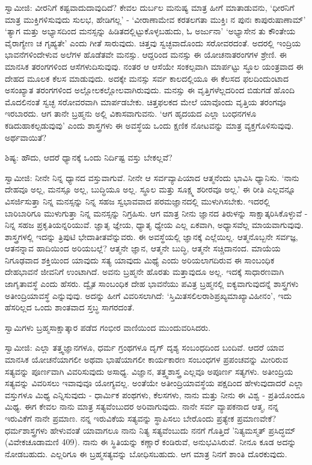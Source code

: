 ಸ್ವಾಮೀಜಿ: ವೀರನಿಗೆ ಕಷ್ಟವಾದುದಾವುದಿದೆ? ಕೇವಲ ದುರ್ಬಲ ಮನುಷ್ಯ ಮಾತ್ರ ಹೀಗೆ ಮಾತಾಡುವನು, ‘ಧೀರನಿಗೆ ಮಾತ್ರ ಮುಕ್ತಿಗಳಿಸುವುದು ಸುಲಭ, ಹೇಡಿಗಲ್ಲ’ - ‘ವೀರಾಣಾಮೇವ ಕರತಲಗತಾ ಮುಕ್ತಿಃ ನ ಪುನಃ ಕಾಪುರುಷಾಣಾಮ್’ ‘ತ್ಯಾಗ ಮತ್ತು ಅಭ್ಯಾಸದಿಂದ ಮನಸ್ಸನ್ನು ಹಿಡಿತದಲ್ಲಿಟ್ಟುಕೊಳ್ಳಬಹುದು, ಓ ಅರ್ಜುನಾ’ ‘ಅಭ್ಯಾಸೇನ ತು ಕೌಂತೇಯ ವೈರಾಗ್ಯೇಣ ಚ ಗೃಹ್ಯತೇ’ ಎಂದು ಗೀತೆ ಸಾರುವುದು. ಚಿತ್ತವು ಸ್ವಚ್ಛವಾದೊಂದು ಸರೋವರದಂತೆ. ಅದರಲ್ಲಿ ಇಂದ್ರಿಯ ಭಾವನೆಗಳಿಂದೇಳುವ ಅಲೆಗಳ ಹೊಡೆತವೇ ಮನಸ್ಸು. ಆದ್ದರಿಂದ ಮನಸ್ಸು ಈ ಯೋಚನಾತರಂಗಗಳ ಶ್ರೇಣಿ. ಈ ಮಾನಸಿಕ ತರಂಗಗಳಿಂದ ಆಸೆಗಳುದಿಸುವುವು. ನಂತರ ಆ ಆಸೆಯೇ ಸಂಕಲ್ಪವಾಗಿ ಮಾರ್ಪಟ್ಟು ಸ್ಥೂಲ ಯಂತ್ರವಾದ ಈ ದೇಹದ ಮೂಲಕ ಕೆಲಸ ಮಾಡುವುದು. ಅದಕ್ಕೇ ಮನಸ್ಸು ಸರ್ವ ಕಾಲದಲ್ಲಿಯೂ ಈ ಕೆಲಸದ ಫಲದಿಂದುಂಟಾದ ಅಸಂಖ್ಯಾತ ತರಂಗಗಳಿಂದ ಅಲ್ಲೋಲಕಲ್ಲೋಲವಾಗಿರುವುದು. ಮನಸ್ಸು ಈ ವೃತ್ತಿಗಳೆಲ್ಲದರಿಂದ ಬಿಡುಗಡೆ ಹೊಂದಿ ಮೊದಲಿನಂತೆ ಸ್ವಚ್ಛ ಸರೋವರವಾಗಿ ಮಾರ್ಪಡಬೇಕು. ಚಿತ್ತಫಲಕದ ಮೇಲೆ ಯಾವೊಂದು ವೃತ್ತಿಯ ತರಂಗವೂ ಇರಬಾರದು. ಆಗ ತಾನೇ ಬ್ರಹ್ಮನು ಅಲ್ಲಿ ವಿಕಾಸವಾಗುವನು. ‘ಆಗ ಹೃದಯದ ಎಲ್ಲಾ ಬಂಧನಗಳೂ ಕಡಿದುಹಾಕಲ್ಪಡುವುವು’ ಎಂದು ಶಾಸ್ತ್ರಗಳು ಈ ಅವಸ್ಥೆಯ ಒಂದು ಕ್ಷಣಿಕ ನೋಟವನ್ನು ಮಾತ್ರ ವ್ಯಕ್ತಗೊಳಿಸುವುವು. ಅರ್ಥವಾಯಿತೆ?

ಶಿಷ್ಯ: ಹೌದು, ಆದರೆ ಧ್ಯಾನಕ್ಕೆ ಒಂದು ನಿರ್ದಿಷ್ಟ ವಸ್ತು ಬೇಕಲ್ಲವೆ?

ಸ್ವಾಮೀಜಿ: ನೀನೇ ನಿನ್ನ ಧ್ಯಾನದ ವಸ್ತುವಾಗುವೆ. ನೀನೇ ಆ ಸರ್ವವ್ಯಾಪಿಯಾದ ಆತ್ಮನೆಂದು ಭಾವಿಸಿ ಧ್ಯಾನಿಸು. ‘ನಾನು ದೇಹವೂ ಅಲ್ಲ, ಮನಸ್ಸೂ ಅಲ್ಲ, ಬುದ್ಧಿಯೂ ಅಲ್ಲ. ಸ್ಥೂಲ ಮತ್ತು ಸೂಕ್ಷ್ಮ ಶರೀರವೂ ಅಲ್ಲ.’ ಈ ರೀತಿ ಎಲ್ಲವನ್ನೂ ವಿಸರ್ಜಿಸುತ್ತಾ ನಿನ್ನ ಮನಸ್ಸನ್ನು ನಿನ್ನ ಸಹಜ ಸ್ವಭಾವವಾದ ಪರಮಜ್ಞಾನದಲ್ಲಿ ಮುಳುಗಿಸಬೇಕು. ಇದರಲ್ಲಿ ಬಾರಿಬಾರಿಗೂ ಮುಳುಗುತ್ತಾ ನಿನ್ನ ಮನಸ್ಸನ್ನು ನಿಗ್ರಹಿಸು. ಆಗ ಮಾತ್ರ ನೀನು ಜ್ಞಾನದ ತಿರುಳನ್ನು ಸಾಕ್ಷಾತ್ಕರಿಸಿಕೊಳ್ಳುವೆ - ನಿನ್ನ ಸಹಜ ಪ್ರಕೃತಿಯನ್ನರಿಯುವೆ. ಜ್ಞಾತೃ ಜ್ಞೇಯ, ಧ್ಯಾತೃ ಧ್ಯೇಯ ಎಲ್ಲ ಏಕವಾಗಿ, ಅಧ್ಯಾಸವೆಲ್ಲ ಮಾಯವಾಗುವುವು. ಶಾಸ್ತ್ರಗಳಲ್ಲಿ ಇದನ್ನು ತ್ರಿಪುಟಿ ಭೇದಾತೀತವೆನ್ನುವರು. ಈ ಅವಸ್ಥೆಯಲ್ಲಿ ಜ್ಞಾನಕ್ಕೆ ಎಲ್ಲೆಯಿಲ್ಲ. ಆತ್ಮನೊಬ್ಬನೇ ಸರ್ವಜ್ಞ, ಆತನನ್ನಾವ ಹಾದಿಯಿಂದ ಅರಿಯಬಲ್ಲೆ? ಆತ್ಮನೇ ಜ್ಞಾನ, ಆತ್ಮನೇ ಬುದ್ಧಿ, ಆತ್ಮನೇ ಸಚ್ಚಿದಾನಂದ. ಮಾಯೆಯ ನಿಗೂಢವಾದ ಶಕ್ತಿಯಿಂದ ಯಾವುದು ಸತ್ಯ ಯಾವುದು ಮಿಥ್ಯೆ ಎಂದು ಅರಿಯಲಾಗದಿರುವ ಈ ಸಾಂಬಂಧಿಕ ದೇಹಭಾವನೆ ಜೀವನಿಗೆ ಉಂಟಾಗಿದೆ. ಅವನು ಬ್ರಹ್ಮನೇ ಹೊರತು ಮತ್ತಾವುದೂ ಅಲ್ಲ. ಇದಕ್ಕೆ ಸಾಧಾರಣವಾಗಿ ಜಾಗೃತಾವಸ್ಥೆ ಎಂದು ಹೆಸರು. ದ್ವೈತ ಸಾಂಬಂಧಿಕ ದೇಹ ಭಾವನೆಯು ಪವಿತ್ರ ಬ್ರಹ್ಮನಲ್ಲಿ ಐಕ್ಯವಾಗುವುದನ್ನೆ ಶಾಸ್ತ್ರಗಳು ಅತೀಂದ್ರಿಯಾವಸ್ಥೆ ಎನ್ನುವುವು. ಅದನ್ನು ಹೀಗೆ ವಿವರಿಸಲಾಗಿದೆ: ‘ಸ್ತಿಮಿತಸಲಿಲರಾಶಿಪ್ರಖ್ಯಮಾಖ್ಯಾವಿಹೀನಂ’, ಇದು ಹೆಸರಿಲ್ಲದ ಒಂದು ಶಾಂತವಾದ ಸ್ತಬ್ಧ ಸಾಗರದಂತೆ.

ಸ್ವಾಮಿಗಳು ಬ್ರಹ್ಮಸಾಕ್ಷಾತ್ಕಾರ ಪಡೆದ ಗಂಭೀರ ವಾಣಿಯಿಂದ ಮುಂದುವರಿಸಿದರು.

ಸ್ವಾಮೀಜಿ: ಎಲ್ಲಾ ತತ್ತ್ವಜ್ಞಾನಗಳೂ, ಧರ್ಮ ಗ್ರಂಥಗಳೂ ದೃಗ್ ದೃಶ್ಯ ಸಂಬಂಧದಿಂದ ಬಂದಿವೆ. ಆದರೆ ಯಾವ ಮಾನಸಿಕ ಯೋಚನೆಯಾಗಲೀ ಅಥವಾ ಭಾಷೆಯಾಗಲೀ ಕಾರ್ಯಕಾರಣ ಸಂಬಂಧಗಳ ಪ್ರಪಂಚವನ್ನು ಮೀರಿರುವ ಸತ್ಯವನ್ನು ಪೂರ್ಣವಾಗಿ ವಿವರಿಸುವುದು ಅಸಾಧ್ಯ. ವಿಜ್ಞಾನ, ತತ್ತ್ವಶಾಸ್ತ್ರ ಎಲ್ಲವೂ ಅಪೂರ್ಣ ಸತ್ಯಗಳು. ಅತೀಂದ್ರಿಯ ಸತ್ಯವನ್ನು ವಿವರಿಸಲು ಇವಾವುವೂ ಯೋಗ್ಯವಲ್ಲ. ಅಂತೆಯೇ ಅತೀಂದ್ರಿಯಾವಸ್ಥೆಯ ಪಕ್ಷದಿಂದ ಹೇಳುವುದಾದರೆ ಎಲ್ಲಾ ವಸ್ತುಗಳೂ ಮಿಥ್ಯ ಎನ್ನಿಸುವುದು - ಧಾರ್ಮಿಕ ಪಂಥಗಳು, ಕೆಲಸಗಳು, ನಾನು ಮತ್ತು ನೀನು ಈ ವಿಶ್ವ - ಪ್ರತಿಯೊಂದೂ ಮಿಥ್ಯ. ಈಗ ಕೇವಲ ನಾನು ಮಾತ್ರ ಸತ್ಯವೆಂಬುದರ ಅರಿವಾಗುವುದು. ನಾನೇ ಸರ್ವ ವ್ಯಾಪಕನಾದ ಆತ್ಮ, ನನ್ನ ಇರುವಿಕೆಗೆ ನಾನೇ ಪ್ರಮಾಣ. ನನ್ನ ಇರುವಿಕೆಯ ಸತ್ಯವನ್ನು ಸ್ಥಾಪಿಸಲು ಬೇರೊಂದು ಪ್ರತ್ಯೇಕ ಪ್ರಮಾಣವೇಕೆ? ಧರ್ಮಶಾಸ್ತ್ರಗಳು ಹೇಳುವಂತೆ ಯಾವಾಗಲೂ ನಾನು ನಿತ್ಯ ಸತ್ಯವೆಂಬುದು ನನಗೆ ಗೊತ್ತಿದೆ 'ನಿತ್ಯಮಸ್ಮತ್ ಪ್ರಸಿದ್ಧಮ್ (ವಿವೇಕಚೂಡಾಮಣಿ 409). ನಾನು ಈ ಸ್ಥಿತಿಯನ್ನು ಕಣ್ಣಾರೆ ಕಂಡಿರುವೆ, ಅನುಭವಿಸಿರುವೆ. ನೀನೂ ಕೂಡ ಅದನ್ನು ನೋಡಬಹುದು. ಎಲ್ಲರಿಗೂ ಈ ಬ್ರಹ್ಮಸತ್ಯವನ್ನು ಬೋಧಿಸಬಹುದು. ಆಗ ಮಾತ್ರ ನಿನಗೆ ಶಾಂತಿ ದೊರಕುವುದು.

